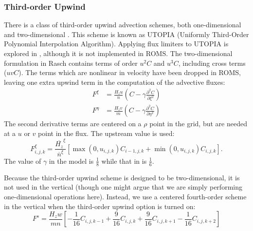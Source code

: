 \subsubsection{Third-order Upwind}
There is a class of third-order upwind advection schemes, both
one-dimensional \citep{Leonard79} and two-dimensional
\citep{Rasch94, SS98}. This scheme
is known as UTOPIA (Uniformly Third-Order Polynomial Interpolation
Algorithm). Applying flux limiters to UTOPIA is explored in
\citet{Thuburn96}, although it is not implemented in ROMS. The
two-dimensional formulation in Rasch contains terms of order $u^2C$
and $u^3C$, including cross terms ($uvC$). The terms which are
nonlinear in velocity have been dropped in ROMS, leaving one extra upwind
term in the computation of the advective fluxes:
\begin{align}
   F^\xi &= \frac{H_z u}{n} \left( C - \gamma \frac{\partial^2
   C}{\partial \xi^2} \right) \\
   F^\eta &= \frac{H_z v}{m} \left( C - \gamma \frac{\partial^2
   C}{\partial \eta^2} \right)
\end{align}
The second derivative terms are centered on a $\rho$ point in the grid,
but are needed at a $u$ or $v$ point in the flux. The upstream value is
used:
\begin{equation}
   F^\xi_{i,j,k} = \frac{\overline{H_z}^\xi}{\overline{n}^\xi}
   \left[ \max(0,u_{i,j,k}) C_{i-1,j,k} +
   \min(0,u_{i,j,k}) C_{i,j,k} \right] .
\label{equp}
\end{equation}
The value of $\gamma$ in the model is
$\frac{1}{8}$ while that in \citet{Rasch94} is $\frac{1}{6}$.

Because the third-order upwind scheme is designed to be
two-dimensional, it is not used in the vertical (though one might argue
that we are simply performing one-dimensional operations here).
Instead, we use a centered fourth-order scheme in the vertical when
the third-order upwind option is turned on:
\begin{equation}
   F^s = \frac{H_z w}{mn} \left[
     - \frac{1}{16} C_{i,j,k-1} + \frac{9}{16} C_{i,j,k} +
       \frac{9}{16} C_{i,j,k+1} - \frac{1}{16} C_{i,j,k+2} \right]
\end{equation}

